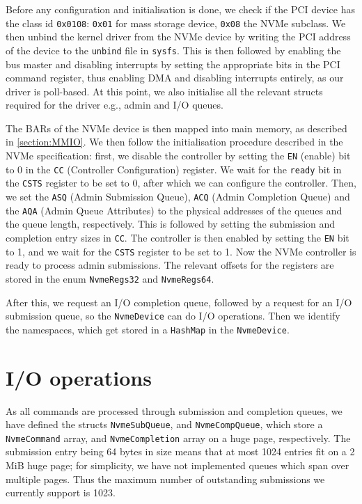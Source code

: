Before any configuration and initialisation is done, we check if the PCI device has the class id \texttt{0x0108}: \texttt{0x01} for mass storage device, \texttt{0x08} the NVMe subclass.
We then unbind the kernel driver from the NVMe device by writing the PCI address of the device to the \texttt{unbind} file in \texttt{sysfs}. This is then followed by enabling the bus master and disabling interrupts by setting the appropriate bits in the PCI command register, thus enabling DMA and disabling interrupts entirely, as our driver is poll-based. At this point, we also initialise all the relevant structs required for the driver e.g., admin and I/O queues.

The BARs of the NVMe device is then mapped into main memory, as described in \autoref{section:MMIO}. We then follow the initialisation procedure described in the NVMe specification: first, we disable the controller by setting the \texttt{EN} (enable) bit to 0 in the \texttt{CC} (Controller Configuration) register. We wait for the \texttt{ready} bit in the \texttt{CSTS} register to be set to 0, after which we can configure the controller. Then, we set the \texttt{ASQ} (Admin Submission Queue), \texttt{ACQ} (Admin Completion Queue) and the \texttt{AQA} (Admin Queue Attributes) to the physical addresses of the queues and the queue length, respectively. This is followed by setting the submission and completion entry sizes in \texttt{CC}. The controller is then enabled by setting the \texttt{EN} bit to 1, and we wait for the \texttt{CSTS} register to be set to 1. Now the NVMe controller is ready to process admin submissions. The relevant offsets for the registers are stored in the enum \texttt{NvmeRegs32} and \texttt{NvmeRegs64}.


After this, we request an I/O completion queue, followed by a request for an I/O submission queue, so the \texttt{NvmeDevice} can do I/O operations. Then we identify the namespaces, which get stored in a \texttt{HashMap} in the \texttt{NvmeDevice}.

\section{I/O operations}\label{subsection:io}
As all commands are processed through submission and completion queues, we have defined the structs \texttt{NvmeSubQueue}, and \texttt{NvmeCompQueue}, which store a \texttt{NvmeCommand} array, and \texttt{NvmeCompletion} array on a huge page, respectively. The submission entry being 64 bytes in size means that at most 1024 entries fit on a 2 MiB huge page; for simplicity, we have not implemented queues which span over multiple pages. Thus the maximum number of outstanding submissions we currently support is 1023.

